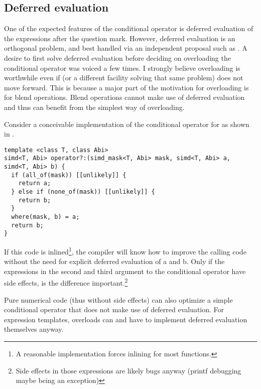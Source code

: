 \subsection{Deferred evaluation}
One of the expected features of the conditional operator is deferred evaluation of the expressions after the question mark.
However, deferred evaluation is an orthogonal problem, and best handled via an independent proposal such as \cite{P0927R2}.
A desire to first solve deferred evaluation before deciding on overloading the conditional operator was voiced a few times.
I strongly believe  overloading is worthwhile even if \cite{P0927R2} (or a different facility solving that same problem) does not move forward.
This is because a major part of the motivation for  overloading is for blend operations.
Blend operations cannot make use of deferred evaluation and thus can benefit from the simplest way of  overloading.

Consider a conceivable implementation of the conditional operator for  as shown in .
\begin{lstlisting}[style=Vc,float,label=lst:simd ?,caption={
Simple \code{operator?:} for \type{simd<T, Abi>}
}]
template <class T, class Abi>
simd<T, Abi> operator?:(simd_mask<T, Abi> mask, simd<T, Abi> a, simd<T, Abi> b) {
  if (all_of(mask)) [[unlikely]] {
    return a;
  } else if (none_of(mask)) [[unlikely]] {
    return b;
  }
  where(mask, b) = a;
  return b;
}
\end{lstlisting}
If this code is inlined\footnote{A reasonable  implementation forces inlining for most functions.}, the compiler will know how to improve the calling code without the need for explicit deferred evaluation of \code a and \code b.
Only if the expressions in the second and third argument to the conditional operator have side effects, is the difference important.\footnote{Side effects in those expressions are likely bugs anyway (printf debugging maybe being an exception)}

Pure numerical code (thus without side effects) can also optimize a simple conditional operator that does not make use of deferred evaluation.
For expression templates,  overloads can and have to implement deferred evaluation themselves anyway.


